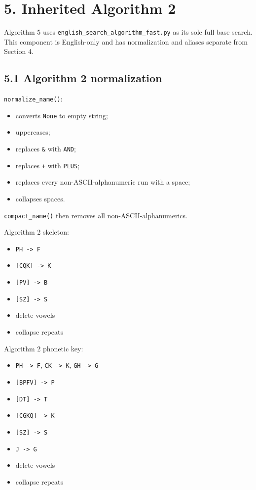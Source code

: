 \section{5. Inherited Algorithm 2}\label{5-inherited-algorithm-2}

Algorithm 5 uses \texttt{english\_\allowbreak{}search\_\allowbreak{}algorithm\_\allowbreak{}fast.py} as its sole full base search. This component is English-only and has normalization and aliases separate from Section 4.

\subsection{5.1 Algorithm 2 normalization}\label{51-algorithm-2-normalization}

\texttt{normalize\_\allowbreak{}name()}:

\begin{itemize}
\tightlist
\item
  converts \texttt{None} to empty string;
\item
  uppercases;
\item
  replaces \texttt{\&} with \texttt{AND};
\item
  replaces \texttt{+} with \texttt{PLUS};
\item
  replaces every non-ASCII-alphanumeric run with a space;
\item
  collapses spaces.
\end{itemize}

\texttt{compact\_\allowbreak{}name()} then removes all non-ASCII-alphanumerics.

Algorithm 2 skeleton:

\begin{itemize}
\tightlist
\item
  \texttt{PH\ -\textgreater{}\ F}
\item
  \texttt{{[}CQK{]}\ -\textgreater{}\ K}
\item
  \texttt{{[}PV{]}\ -\textgreater{}\ B}
\item
  \texttt{{[}SZ{]}\ -\textgreater{}\ S}
\item
  delete vowels
\item
  collapse repeats
\end{itemize}

Algorithm 2 phonetic key:

\begin{itemize}
\tightlist
\item
  \texttt{PH\ -\textgreater{}\ F}, \texttt{CK\ -\textgreater{}\ K}, \texttt{GH\ -\textgreater{}\ G}
\item
  \texttt{{[}BPFV{]}\ -\textgreater{}\ P}
\item
  \texttt{{[}DT{]}\ -\textgreater{}\ T}
\item
  \texttt{{[}CGKQ{]}\ -\textgreater{}\ K}
\item
  \texttt{{[}SZ{]}\ -\textgreater{}\ S}
\item
  \texttt{J\ -\textgreater{}\ G}
\item
  delete vowels
\item
  collapse repeats
\end{itemize}

